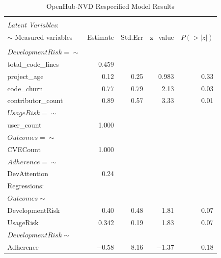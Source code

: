 \begin{table}
	\begin{center}	
		\caption{OpenHub-NVD Respecified Model Results}
		\label{tab:results_openhub}
		\begin{tabular}{l|rrrr}
				\\[-1.8ex]\hline 
				\hline \\[-1.8ex] 
			\textit{Latent Variables}:  & & & & \\  
			$\sim$ Measured variables& Estimate & Std.Err & z$-$value & $P(>|z|)$ \\
				\hline \\[-1.8ex]
			$DevelopmentRisk =\sim$  & & & & \\                                   
			total\_code\_lines   & 0.459 & &  & \\                             
			project\_age         &  0.12 &   0.25 &  0.983 &   0.33\\
			code\_churn           &   0.77  &  0.79  & 2.13   & 0.03\\
			contributor\_count     &   0.89  &  0.57  & 3.33   & 0.01\\
			$UsageRisk =\sim$     & & & & \\                                    
			user\_count   & 1.000     & & & \\                       
			$Outcomes =\sim$    & & & & \\                                     
			CVECount     &  1.000  & & & \\                          
			$Adherence =\sim$   & & & & \\                                      
			DevAttention    &    0.24        & & & \\                    
			Regressions:  & & & & \\  
			$Outcomes \sim$         & & & & \\                                     
			DevelopmentRisk   &  0.40 &   0.48 & 1.81 &   0.07 \\
			UsageRisk     &   0.342  &  0.19  &  1.83 &   0.07\\
			$DevelopmentRisk \sim$        & & & & \\                                  
			Adherence     &    $-0.58$ &   8.16  & $-1.37$ &   0.18\\
		\end{tabular}
	\end{center}
\end{table} 

